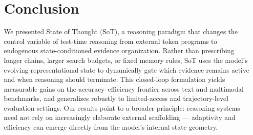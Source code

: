 \vspace{-1mm}
\section{Conclusion}
\label{sec:conclusion}
\vspace{-2mm}
We presented State of Thought (SoT), a reasoning paradigm that changes the control variable of test-time reasoning from external token programs to endogenous state-conditioned evidence organization. Rather than prescribing longer chains, larger search budgets, or fixed memory rules, SoT uses the model's evolving representational state to dynamically gate which evidence remains active and when reasoning should terminate.  This closed-loop formulation yields measurable gains on the accuracy–efficiency frontier across text and multimodal benchmarks, and generalizes robustly to limited-access and trajectory-level evaluation settings. Our results point to a broader principle: reasoning systems need not rely on increasingly elaborate external scaffolding — adaptivity and efficiency can emerge directly from the model's internal state geometry.